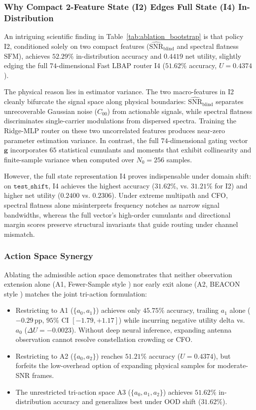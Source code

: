 \subsubsection{Why Compact 2-Feature State (I2) Edges Full State (I4) In-Distribution}
An intriguing scientific finding in Table~\ref{tab:ablation_bootstrap} is that policy I2, conditioned solely on two compact features ($\widehat{\mathrm{SNR}}_{\mathrm{blind}}$ and spectral flatness $\mathrm{SFM}$), achieves $52.29\%$ in-distribution accuracy and $0.4419$ net utility, slightly edging the full $74$-dimensional Fast LBAP router I4 ($51.62\%$ accuracy, $U = 0.4374$). 

The physical reason lies in estimator variance. The two macro-features in I2 cleanly bifurcate the signal space along physical boundaries: $\widehat{\mathrm{SNR}}_{\mathrm{blind}}$ separates unrecoverable Gaussian noise ($C_{00}$) from actionable signals, while spectral flatness discriminates single-carrier modulations from dispersed spectra. Training the Ridge-MLP router on these two uncorrelated features produces near-zero parameter estimation variance. In contrast, the full $74$-dimensional gating vector $\mathbf{g}$ incorporates $65$ statistical cumulants and moments that exhibit collinearity and finite-sample variance when computed over $N_0 = 256$ samples.

However, the full state representation I4 proves indispensable under domain shift: on $\texttt{test\_shift}$, I4 achieves the highest accuracy ($31.62\%$, vs. $31.21\%$ for I2) and higher net utility ($0.2400$ vs. $0.2306$). Under extreme multipath and CFO, spectral flatness alone misinterprets frequency notches as narrow signal bandwidths, whereas the full vector's high-order cumulants and directional margin scores preserve structural invariants that guide routing under channel mismatch.

\subsubsection{Action Space Synergy}
Ablating the admissible action space demonstrates that neither observation extension alone (A1, Fewer-Sample style \cite{guo2025fewer}) nor early exit alone (A2, BEACON style \cite{liu2026beacon}) matches the joint tri-action formulation:
\begin{itemize}
    \item Restricting to A1 ($\{a_0, a_1\}$) achieves only $45.75\%$ accuracy, trailing $a_1$ alone ($-0.29\,\mathrm{pp}$, $95\%$ CI $[-1.79, +1.17]$) while incurring negative utility delta vs. $a_0$ ($\Delta U = -0.0023$). Without deep neural inference, expanding antenna observation cannot resolve constellation crowding or CFO.
    \item Restricting to A2 ($\{a_0, a_2\}$) reaches $51.21\%$ accuracy ($U = 0.4374$), but forfeits the low-overhead option of expanding physical samples for moderate-SNR frames.
    \item The unrestricted tri-action space A3 ($\{a_0, a_1, a_2\}$) achieves $51.62\%$ in-distribution accuracy and generalizes best under OOD shift ($31.62\%$).
\end{itemize}


